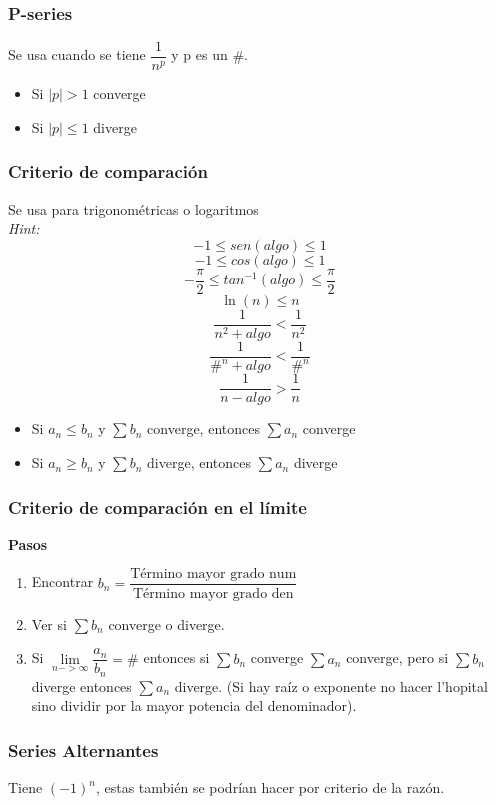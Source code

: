 \subsubsection{P-series}
Se usa cuando se tiene $\dfrac{1}{n^p}$ y p es un $\#$. 
\begin{itemize}
	\item Si $|p|>1$ converge
	\item Si $|p|\le1$ diverge
\end{itemize}
\subsubsection{Criterio de comparación}
Se usa para trigonométricas o logaritmos\\
\textit{Hint:} $$-1\leq sen(algo)\leq 1$$ $$-1\leq cos(algo)\leq 1$$ $$-\dfrac{\pi}{2}\leq tan^{-1}(algo)\leq \dfrac{\pi}{2}$$ $$\ln(n)\leq n$$ $$\dfrac{1}{n^2+algo}<\dfrac{1}{n^2}$$ $$\dfrac{1}{\#^n+algo}<\dfrac{1}{\#^n}$$ $$\dfrac{1}{n-algo}>\dfrac{1}{n}$$

\begin{itemize}
	\item Si $a_n\le b_n$ y $\sum b_n$ converge, entonces $\sum a_n$ converge
	\item Si $a_n\ge b_n$ y $\sum b_n$ diverge, entonces $\sum a_n$ diverge
\end{itemize}

\subsubsection{Criterio de comparación en el límite}

\textbf{Pasos}
\begin{enumerate}
	\item Encontrar $b_n=\dfrac{\text{Término mayor grado num}}{\text{Término mayor grado den}}$
	\item Ver si $\sum b_n$ converge o diverge.
	\item Si $\lim\limits_{n -> \infty}\dfrac{a_n}{b_n}=\#$ entonces si $\sum b_n$ converge $\sum a_n$ converge, pero si $\sum b_n$ diverge entonces $\sum a_n$ diverge. (Si hay raíz o exponente no hacer l'hopital sino dividir por la mayor potencia del denominador).
\end{enumerate}

\subsubsection{Series Alternantes}
Tiene $(-1)^n$, estas también se podrían hacer por criterio de la razón.


